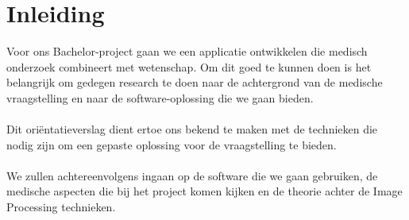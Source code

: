 \section{Inleiding}
\label{inleiding}
Voor ons Bachelor-project gaan we een applicatie ontwikkelen die medisch onderzoek combineert met wetenschap. 
Om dit goed te kunnen doen is het belangrijk om gedegen research te doen naar de achtergrond van de medische vraagstelling en naar de software-oplossing die we gaan bieden.
\\
\\
Dit ori\"{e}ntatieverslag dient ertoe ons bekend te maken met de technieken die nodig zijn om een gepaste oplossing voor de vraagstelling te bieden.
\\
\\
We zullen achtereenvolgens ingaan op de software die we gaan gebruiken, de medische aspecten die bij het project komen kijken en de theorie achter de Image Processing technieken.
